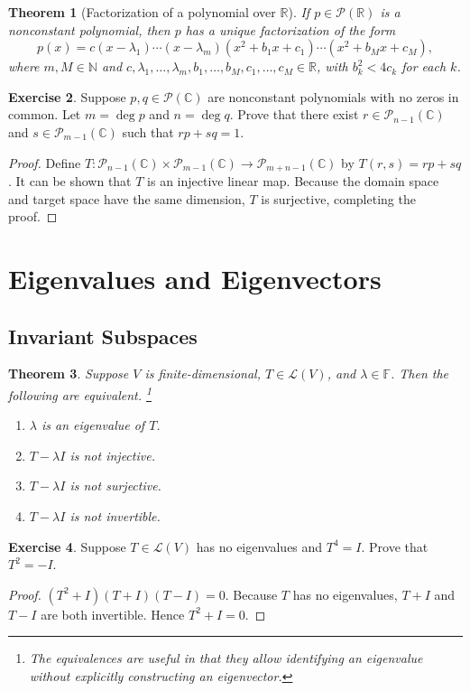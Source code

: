 \documentclass{tufte-handout}
\theoremstyle{plain} %
\newtheorem{thm}{Theorem}
\theoremstyle{definition}
\newtheorem{exer}[thm]{Exercise}
\theoremstyle{remark}
\newcommand{\R}{\mathbb{R}}
\newcommand{\N}{\mathbb{N}}
\newcommand{\C}{\mathbb{C}}
\newcommand{\F}{\mathbb{F}}
\renewcommand{\L}{\mathcal{L}}
\renewcommand{\P}{\mathcal{P}}
\begin{document}
\begin{thm}[Factorization of a polynomial over $\R$]
	If $p\in\P(\R)$ is a nonconstant polynomial, then $p$ has a unique factorization of the form
	\[p(x)=c(x-\lambda_1)\cdots(x-\lambda_m)(x^2+b_1x+c_1)\cdots(x^2+b_Mx+c_M),\]
	where $m,M\in\N$ and $c,\lambda_1,\dots,\lambda_m,b_1,\dots,b_M,c_1,\dots,c_M\in\R$, with $b_k^2<4c_k$ for each $k$.
\end{thm}

\begin{exer}
	Suppose $p,q\in\P(\C)$ are nonconstant polynomials with no zeros in common. Let $m=\deg p$ and $n=\deg q$. Prove that there exist $r\in\P_{n-1}(\C)$ and $s\in\P_{m-1}(\C)$ such that $rp+sq=1$.
\end{exer}
\begin{proof}
	Define $T:\P_{n-1}(\C)\times\P_{m-1}(\C)\to\P_{m+n-1}(\C)$ by $T(r,s)=rp+sq$. It can be shown that $T$ is an injective linear map. Because the domain space and target space have the same dimension, $T$ is surjective, completing the proof.
\end{proof}


\section{Eigenvalues and Eigenvectors}
\subsection{Invariant Subspaces}
\begin{thm}
	Suppose $V$ is finite-dimensional, $T\in\L(V)$, and $\lambda\in\F$. Then the following are equivalent.%
	\footnote{The equivalences are useful in that they allow identifying an eigenvalue without explicitly constructing an eigenvector.}
	\begin{enumerate}
		\item $\lambda$ is an eigenvalue of $T$.
		\item $T-\lambda I$ is not injective.
		\item $T-\lambda I$ is not surjective.
		\item $T-\lambda I$ is not invertible.
	\end{enumerate}
\end{thm}

\begin{exer}
	Suppose $T\in\L(V)$ has no eigenvalues and $T^4=I$. Prove that $T^2=-I$.
\end{exer}
\begin{proof}
	$(T^2+I)(T+I)(T-I)=0$. Because $T$ has no eigenvalues, $T+I$ and $T-I$ are both invertible. Hence $T^2+I=0$.
\end{proof}
\end{document}
